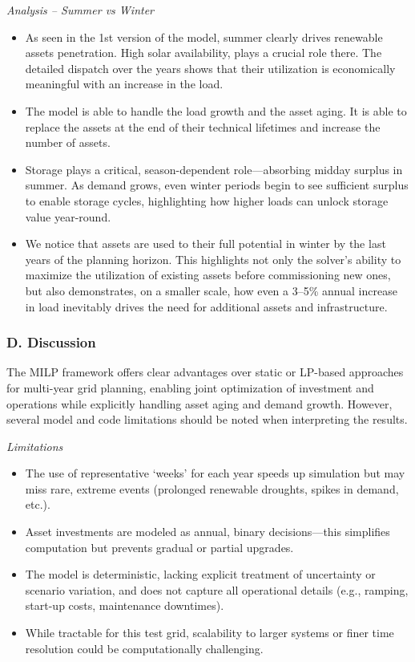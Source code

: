 \newpage
\textit{Analysis -- Summer vs Winter}
\vspace{-0.4em}
\begin{itemize}
    \item As seen in the 1st version of the model, summer clearly drives renewable assets
    penetration. High solar availability, plays a crucial role there. The detailed dispatch over the years 
    shows that their utilization is economically meaningful with an increase in the load.
    \item The model is able to handle the load growth and the asset aging. It is able to 
    replace the assets at the end of their technical lifetimes and increase the number of assets.
    \item Storage plays a critical, season-dependent role—absorbing midday surplus in summer. 
    As demand grows, even winter periods begin to see sufficient surplus to enable storage cycles, 
    highlighting how higher loads can unlock storage value year-round.
    \item We notice that assets are used to their full potential in winter by the last 
    years of the planning horizon. This highlights not only the solver’s ability to 
    maximize the utilization of existing assets before commissioning new ones, but also 
    demonstrates, on a smaller scale, how even a 3–5\% annual increase in load inevitably 
    drives the need for additional assets and infrastructure.
\end{itemize}

\subsubsection*{D. Discussion}
The MILP framework offers clear advantages over static or LP-based approaches for multi-year grid 
planning, enabling joint optimization of investment and operations while explicitly handling 
asset aging and demand growth. However, several model and code limitations should be noted when 
interpreting the results.


\textit{Limitations}
\vspace{-0.4em}
\begin{itemize}
    \item The use of representative ‘weeks’ for each year speeds up simulation but may miss rare, extreme events 
    (prolonged renewable droughts, spikes in demand, etc.). 
    \item Asset investments are modeled as annual, binary decisions—this simplifies 
    computation but prevents gradual or partial upgrades. 
    \item The model is deterministic, lacking explicit treatment of uncertainty or scenario variation, 
    and does not capture all operational details (e.g., ramping, start-up costs, maintenance downtimes). 
    \item While tractable for this test grid, scalability to larger systems or finer time resolution 
    could be computationally challenging. 
\end{itemize}


